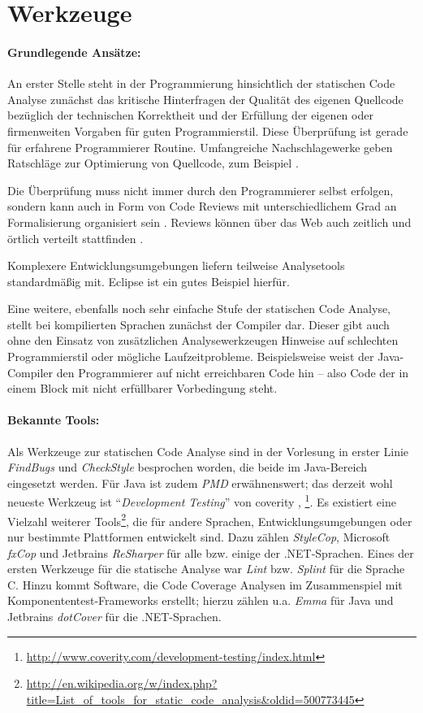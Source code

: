 \section{Werkzeuge}

\paragraph{Grundlegende Ansätze:} An erster Stelle steht in der Programmierung hinsichtlich der statischen Code Analyse zunächst das kritische Hinterfragen der Qualität des eigenen Quellcode bezüglich der technischen Korrektheit und der  Erfüllung der eigenen oder firmenweiten Vorgaben für guten Programmierstil. Diese Überprüfung ist gerade für erfahrene Programmierer Routine. Umfangreiche Nachschlagewerke geben Ratschläge zur Optimierung von Quellcode, zum Beispiel \cite{mcconnell2004}.

Die Überprüfung muss nicht immer durch den Programmierer selbst erfolgen, sondern kann auch in Form von Code Reviews mit unterschiedlichem Grad an Formalisierung organisiert sein \citep{spillner2011}. Reviews können über das Web auch zeitlich und örtlich verteilt stattfinden \citep{codereviews:meyer}.

Komplexere Entwicklungsumgebungen liefern teilweise Analysetools standardmäßig mit. Eclipse ist ein gutes Beispiel hierfür.

Eine weitere, ebenfalls noch sehr einfache Stufe der statischen Code Analyse, stellt bei kompilierten Sprachen zunächst der Compiler dar. Dieser gibt auch ohne den Einsatz von zusätzlichen Analysewerkzeugen Hinweise auf schlechten Programmierstil oder mögliche Laufzeitprobleme. Beispielsweise weist der Java-Compiler den Programmierer auf nicht erreichbaren Code hin -- also Code der in einem Block mit nicht erfüllbarer Vorbedingung steht.

\paragraph{Bekannte Tools:} Als Werkzeuge zur statischen Code Analyse sind in der Vorlesung in erster Linie \textit{FindBugs} und \textit{CheckStyle} besprochen worden, die beide im Java-Bereich eingesetzt werden. Für Java ist zudem \textit{PMD} erwähnenswert; das derzeit wohl neueste Werkzeug ist ``\textit{Development Testing}'' von coverity \citep{neumann2012}, \footnote{\url{http://www.coverity.com/development-testing/index.html}}. Es existiert eine Vielzahl weiterer Tools\footnote{\url{http://en.wikipedia.org/w/index.php?title=List_of_tools_for_static_code_analysis\&oldid=500773445}}, die für andere Sprachen, Entwicklungsumgebungen oder nur bestimmte Plattformen entwickelt sind. Dazu zählen \textit{StyleCop}, Microsoft \textit{fxCop} und Jetbrains \textit{ReSharper} für alle bzw. einige der .NET-Sprachen. Eines der ersten Werkzeuge für die statische Analyse war \textit{Lint} bzw. \textit{Splint} für die Sprache C. Hinzu kommt Software, die  Code Coverage Analysen im Zusammenspiel mit Komponententest-Frameworks erstellt; hierzu zählen u.a. \textit{Emma} für Java und Jetbrains \textit{dotCover} für die .NET-Sprachen.

